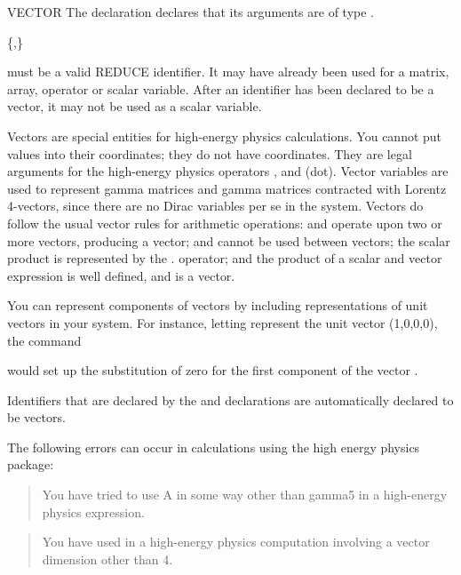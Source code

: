 \begin{Declaration}{VECTOR}
The  declaration declares that its arguments are of type .
\begin{Syntax}
 \{,\}\optional
\end{Syntax}

 must be a valid REDUCE identifier.  It may have already been
used for a matrix, array, operator or scalar variable.  After an identifier
has been declared to be a vector, it may not be used as a scalar variable.

\begin{Comments}
Vectors are special entities for high-energy physics calculations.  You
cannot put values into their coordinates; they do not have coordinates.
They are legal arguments for the high-energy physics operators
,  and  (dot).  Vector variables are
used to represent gamma matrices and gamma matrices contracted with Lorentz
4-vectors, since there are no Dirac variables per se in the system.
Vectors do follow the usual vector rules for arithmetic operations:
\name{+} and \name{-} operate upon two or more vectors, producing a
vector; \name{*} and \name{/} cannot be used between vectors; the
scalar product is represented by the . operator; and the product of a
scalar and vector expression is well defined, and is a vector.

You can represent components of vectors by including representations of unit
vectors in your system.  For instance, letting  represent the unit
vector (1,0,0,0), the command


would set up the substitution of zero for the first component of the vector
.

Identifiers that are declared by the  and  declarations are
automatically declared to be vectors.

The following errors can occur in calculations using the high energy
physics package:

\begin{quote}
You have tried to use A in some way other than gamma5 in a
high-energy physics expression.
\end{quote}

\begin{quote}
You have used  in a high-energy physics
computation involving a vector dimension other than 4.
\end{quote}


\end{Comments}
\end{Declaration}
